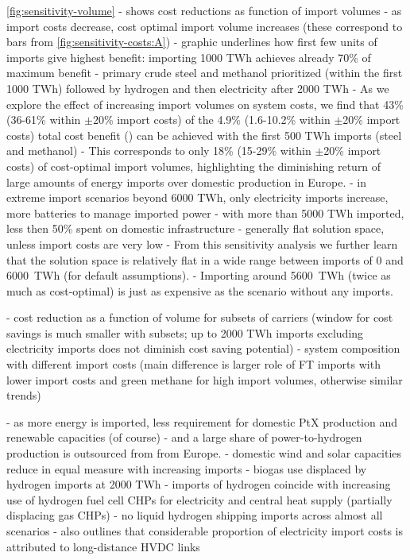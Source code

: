 \cref{fig:sensitivity-volume}
- shows cost reductions as function of import volumes
- as import costs decrease, cost optimal import volume increases (these correspond to bars from \cref{fig:sensitivity-costs:A})
- graphic underlines how first few units of imports give highest benefit: importing 1000 TWh achieves already 70\% of maximum benefit
- primary crude steel and methanol prioritized (within the first 1000 TWh) followed by hydrogen and then electricity after 2000 TWh
- As we explore the effect of increasing import volumes on system
costs, we find that 43\% (36-61\% within $\pm$20\% import costs) of the 4.9\% (1.6-10.2\% within $\pm$20\% import costs) total cost benefit () can be achieved with the first 500 TWh imports (steel and methanol)
- This corresponds to only 18\% (15-29\% within $\pm$20\% import costs) of cost-optimal import volumes, highlighting the diminishing return of large amounts of energy imports over domestic production in Europe.
- in extreme import scenarios beyond 6000 TWh, only electricity imports increase, more batteries to manage imported power
- with more than 5000 TWh imported, less then 50\% spent on domestic infrastructure
- generally flat solution space, unless import costs are very low
- From this sensitivity analysis we further learn that the solution space is relatively flat in a wide range between imports of 0 and
6000~TWh (for default assumptions).
- Importing around 5600~TWh (twice as much as cost-optimal) is just as expensive as the scenario without any imports.

-  cost reduction as a function of volume for subsets of carriers (window for cost savings is much smaller with subsets; up to 2000 TWh imports excluding electricity imports does not diminish cost saving potential)
-  system composition with different import costs  (main difference is larger role of FT imports with lower import costs and green methane for high import volumes, otherwise similar trends)

- as more energy is imported, less requirement for domestic PtX production and renewable capacities (of course)
- and a large share of power-to-hydrogen production is outsourced from from Europe.
- domestic wind and solar capacities reduce in equal measure with increasing imports
- biogas use displaced by hydrogen imports at 2000 TWh
- imports of hydrogen coincide with increasing use of hydrogen fuel cell CHPs for electricity and central heat supply (partially displacing gas CHPs)
- no liquid hydrogen shipping imports across almost all scenarios
- also outlines that considerable proportion of electricity import costs is attributed to long-distance HVDC links


